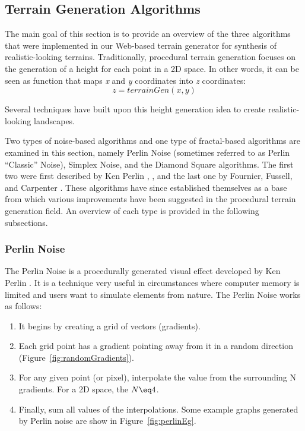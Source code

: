 \subsection{Terrain Generation Algorithms}

The main goal of this section is to provide an overview of the three algorithms that were implemented in our Web-based terrain generator for synthesis of realistic-looking terrains. Traditionally, procedural terrain generation focuses on the generation of a height for each point in a 2D space. In other words, it can be seen as function that maps \textit{x} and \textit{y} coordinates into \textit{z} coordinates: \[z=terrainGen(x, y)\]

Several techniques have built upon this height generation idea to create realistic-looking landscapes.

Two types of noise-based algorithms and one type of fractal-based algorithms are examined in this section, namely Perlin Noise (sometimes referred to as Perlin ``Classic'' Noise), Simplex Noise, and the Diamond Square algorithms. The first two were first described by Ken Perlin \cite{perlin:2002}, \cite{perlin:2001}, and the last one by Fournier, Fussell, and Carpenter \cite{fournier:1982}. These algorithms have since established themselves as a base from which various improvements have
been suggested \cite{ong:2005, lechner:2006, pi:2006, li:2006, doran:2010} in the  procedural terrain generation field. An overview of each type is provided in the following subsections. 

\subsubsection{Perlin Noise}
The Perlin Noise is a procedurally generated visual effect developed by Ken Perlin \cite{perlin:2002}. It is a technique very useful in circumstances where computer memory is limited and users want to simulate elements from nature. The Perlin Noise works as follows:

\begin{enumerate}
\item It begins by creating a grid of vectors (gradients).
\item Each grid point has a gradient pointing away from it in a random direction (Figure~\ref{fig:randomGradients}).
\item For any given point (or pixel), interpolate the value from the surrounding N gradients. For a 2D space, the $N \eq 4$.
\item Finally, sum all values of the interpolations. Some example graphs generated by Perlin noise are show in Figure~\ref{fig:perlinEg}.
\end{enumerate}

